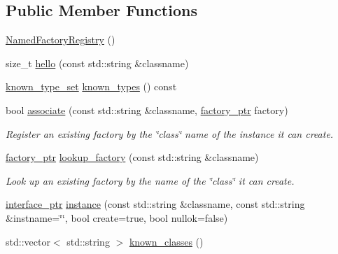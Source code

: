 \subsection*{Public Member Functions}
\begin{DoxyCompactItemize}
\item 
\hyperlink{class_wire_cell_1_1_named_factory_registry_ab8ee15e6702c7714b712c213e07ea3c6}{Named\+Factory\+Registry} ()
\item 
size\+\_\+t \hyperlink{class_wire_cell_1_1_named_factory_registry_ab5844c96704cab954fed1bffb224dc78}{hello} (const std\+::string \&classname)
\item 
\hyperlink{class_wire_cell_1_1_named_factory_registry_a166047268e8cb29c0ea05ae35a80db0c}{known\+\_\+type\+\_\+set} \hyperlink{class_wire_cell_1_1_named_factory_registry_ab48a0b93547621847770a26929691424}{known\+\_\+types} () const
\item 
bool \hyperlink{class_wire_cell_1_1_named_factory_registry_acde24109a432adf658c5c23f97903251}{associate} (const std\+::string \&classname, \hyperlink{class_wire_cell_1_1_named_factory_registry_a4d693bf86f7a8a24ac7dc00d92d929cf}{factory\+\_\+ptr} factory)
\begin{DoxyCompactList}\small\item\em Register an existing factory by the \char`\"{}class\char`\"{} name of the instance it can create. \end{DoxyCompactList}\item 
\hyperlink{class_wire_cell_1_1_named_factory_registry_a4d693bf86f7a8a24ac7dc00d92d929cf}{factory\+\_\+ptr} \hyperlink{class_wire_cell_1_1_named_factory_registry_a355e9be03e1950d63a14ae9bb2989918}{lookup\+\_\+factory} (const std\+::string \&classname)
\begin{DoxyCompactList}\small\item\em Look up an existing factory by the name of the \char`\"{}class\char`\"{} it can create. \end{DoxyCompactList}\item 
\hyperlink{class_wire_cell_1_1_named_factory_registry_a1098a42a84d98eae7cdb3cc9a0602e38}{interface\+\_\+ptr} \hyperlink{class_wire_cell_1_1_named_factory_registry_a81b540cbf24b04c728ad24a7e0af6c2e}{instance} (const std\+::string \&classname, const std\+::string \&instname=\char`\"{}\char`\"{}, bool create=true, bool nullok=false)
\item 
std\+::vector$<$ std\+::string $>$ \hyperlink{class_wire_cell_1_1_named_factory_registry_ab463521dc3c31192252a4ba154c1d967}{known\+\_\+classes} ()
\end{DoxyCompactItemize}


